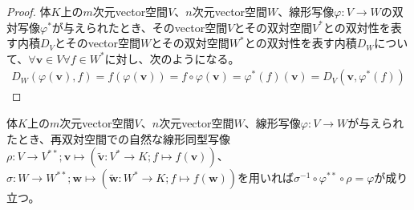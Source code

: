 \documentclass[dvipdfmx]{jsarticle}
\begin{document}
\begin{proof}
体$K$上の$m$次元vector空間$V$、$n$次元vector空間$W$、線形写像$\varphi:V \rightarrow W$の双対写像$\varphi^{*}$が与えられたとき、そのvector空間$V$とその双対空間$V^{*}$との双対性を表す内積$D_{V}$とそのvector空間$W$とその双対空間$W^{*}$との双対性を表す内積$D_{W}$について、$\forall\mathbf{v} \in V\forall f \in W^{*}$に対し、次のようになる。
\begin{align*}
D_{W}\left( \varphi\left( \mathbf{v} \right),f \right) = f\left( \varphi\left( \mathbf{v} \right) \right) = f \circ \varphi\left( \mathbf{v} \right) = \varphi^{*}(f)\left( \mathbf{v} \right) = D_{V}\left( \mathbf{v},\varphi^{*}(f) \right)
\end{align*}
\end{proof}
\begin{thm}\label{2.4.4.14}
体$K$上の$m$次元vector空間$V$、$n$次元vector空間$W$、線形写像$\varphi:V \rightarrow W$が与えられたとき、再双対空間での自然な線形同型写像$\rho:V \rightarrow V^{**};\mathbf{v} \mapsto \left( \widetilde{\mathbf{v}}:V^{*} \rightarrow K;f \mapsto f\left( \mathbf{v} \right) \right)$、$\sigma:W \rightarrow W^{**};\mathbf{w} \mapsto \left( \widetilde{\mathbf{w}}:W^{*} \rightarrow K;f \mapsto f\left( \mathbf{w} \right) \right)$を用いれば$\sigma^{- 1} \circ \varphi^{**} \circ \rho = \varphi$が成り立つ。
\end{thm}
\end{document}
